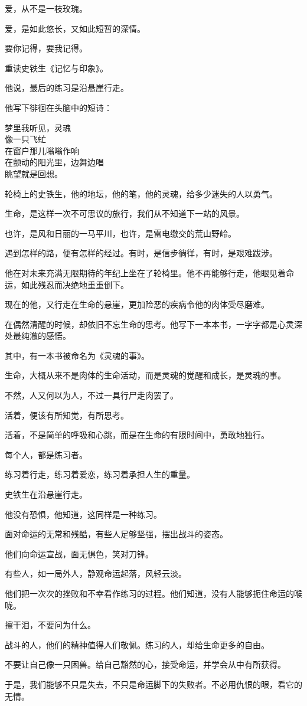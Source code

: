 \documentclass[12pt,a4paper]{article}
\begin{document}
		爱，从不是一枝玫瑰。\par
		爱，是如此悠长，又如此短暂的深情。\par
		要你记得，要我记得。

	\endwriting



		重读史铁生《记忆与印象》。\par
		他说，最后的练习是沿悬崖行走。\par
		他写下徘徊在头脑中的短诗：

		\longpoem{}{}{}
		梦里我听见，灵魂 \\
		像一只飞虻 \\
		在窗户那儿嗡嗡作响 \\
		在颤动的阳光里，边舞边唱 \\
		眺望就是回想。
		\endlongpoem

		轮椅上的史铁生，他的地坛，他的笔，他的灵魂，给多少迷失的人以勇气。\par
		生命，是这样一次不可思议的旅行，我们从不知道下一站的风景。\par
		也许，是风和日丽的一马平川，也许，是雷电缴交的荒山野岭。\par
		遇到怎样的路，便有怎样的经过。有时，是信步徜徉，有时，是艰难跋涉。\par
		他在对未来充满无限期待的年纪上坐在了轮椅里。他不再能够行走，他眼见着命运，如此残忍而决绝地重重倒下。\par
		现在的他，又行走在生命的悬崖，更加险恶的疾病令他的肉体受尽磨难。\par
		在偶然清醒的时候，却依旧不忘生命的思考。他写下一本本书，一字字都是心灵深处最纯澈的感悟。\par
		其中，有一本书被命名为《灵魂的事》。\par
		生命，大概从来不是肉体的生命活动，而是灵魂的觉醒和成长，是灵魂的事。\par
		不然，人又何以为人，不过一具行尸走肉罢了。\par
		活着，便该有所知觉，有所思考。\par
		活着，不是简单的呼吸和心跳，而是在生命的有限时间中，勇敢地独行。\par
		每个人，都是练习者。\par
		练习着行走，练习着爱恋，练习着承担人生的重量。\par
		史铁生在沿悬崖行走。\par
		他没有恐惧，他知道，这同样是一种练习。\par
		面对命运的无常和残酷，有些人足够坚强，摆出战斗的姿态。\par
		他们向命运宣战，面无惧色，笑对刀锋。\par
		有些人，如一局外人，静观命运起落，风轻云淡。\par
		他们把一次次的挫败和不幸看作练习的过程。他们知道，没有人能够扼住命运的喉咙。\par
		擦干泪，不要问为什么。\par
		战斗的人，他们的精神值得人们敬佩。练习的人，却给生命更多的自由。\par
		不要让自己像一只困兽。给自己豁然的心，接受命运，并学会从中有所获得。\par
		于是，我们能够不只是失去，不只是命运脚下的失败者。不必用仇恨的眼，看它的无情。
\end{document}
